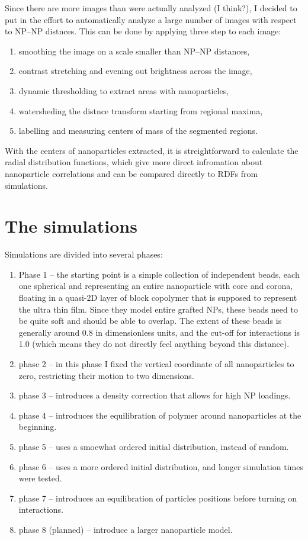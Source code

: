 Since there are more images than were actually analyzed (I think?), I decided to put in the effort to automatically analyze a large number of images with respect to NP--NP distnces. This can be done by applying three step to each image:
\begin{enumerate}
\item smoothing the image on a scale smaller than NP--NP distances,
\item contrast stretching and evening out brightness across the image,
\item dynamic thresholding to extract areas with nanoparticles,
\item watersheding the distnce transform starting from regional maxima,
\item labelling and measuring centers of mass of the segmented regions.
\end{enumerate}

With the centers of nanoparticles extracted, it is streightforward to calculate the radial distribution functions, which give more direct infromation about nanoparticle correlations and can be compared directly to RDFs from simulations.

\section{The simulations}

Simulations are divided into several phases:
\begin{enumerate}
\item Phase 1 -- the starting point is a simple collection of independent beads, each one spherical and representing an entire nanoparticle with core and corona, floating in a quasi-2D layer of block copolymer that is supposed to represent the ultra thin film. Since they model entire grafted NPs, these beads need to be quite soft and should be able to overlap. The extent of these beads is generally around 0.8 in dimensionless units, and the cut-off for interactions is 1.0 (which means they do not directly feel anything beyond this distance).
\item phase 2 -- in this phase I fixed the vertical coordinate of all nanoparticles to zero, restricting their motion to two dimensions.
\item phase 3 -- introduces a density correction that allows for high NP loadings.
\item phase 4 -- introduces the equilibration of polymer around nanoparticles at the beginning.
\item phase 5 -- uses a smoewhat ordered initial distribution, instead of random.
\item phase 6 -- uses a more ordered initial distribution, and longer simulation times were tested.
\item phase 7 -- introduces an equilibration of particles positions before turning on interactions.
\item phase 8 (planned) -- introduce a larger nanoparticle model.
\end{enumerate}
